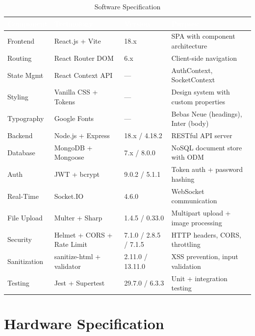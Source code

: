 \documentclass[12pt,a4paper,oneside]{report}
\begin{document}
\begin{table}[H]
\centering
\caption{Software Specification}
\label{tab:software}
\small
\begin{tabularx}{\textwidth}{|l|l|l|X|}
\hline
\rowcolor{tableHeader}
\textcolor{white}{\textbf{Component}} & \textcolor{white}{\textbf{Technology}} & \textcolor{white}{\textbf{Version}} & \textcolor{white}{\textbf{Purpose}} \\
\hline
Frontend        & React.js + Vite            & 18.x  & SPA with component architecture \\
\hline\rowcolor{tableRow}
Routing         & React Router DOM           & 6.x   & Client-side navigation \\
\hline
State Mgmt      & React Context API          & ---   & AuthContext, SocketContext \\
\hline\rowcolor{tableRow}
Styling         & Vanilla CSS + Tokens       & ---   & Design system with custom properties \\
\hline
Typography      & Google Fonts               & ---   & Bebas Neue (headings), Inter (body) \\
\hline\rowcolor{tableRow}
Backend         & Node.js + Express          & 18.x / 4.18.2 & RESTful API server \\
\hline
Database        & MongoDB + Mongoose         & 7.x / 8.0.0   & NoSQL document store with ODM \\
\hline\rowcolor{tableRow}
Auth            & JWT + bcrypt               & 9.0.2 / 5.1.1 & Token auth + password hashing \\
\hline
Real-Time       & Socket.IO                  & 4.6.0 & WebSocket communication \\
\hline\rowcolor{tableRow}
File Upload     & Multer + Sharp             & 1.4.5 / 0.33.0 & Multipart upload + image processing \\
\hline
Security        & Helmet + CORS + Rate Limit & 7.1.0 / 2.8.5 / 7.1.5 & HTTP headers, CORS, throttling \\
\hline\rowcolor{tableRow}
Sanitization    & sanitize-html + validator  & 2.11.0 / 13.11.0 & XSS prevention, input validation \\
\hline
Testing         & Jest + Supertest           & 29.7.0 / 6.3.3 & Unit + integration testing \\
\hline
\end{tabularx}
\end{table}

\section{Hardware Specification}
\end{document}
